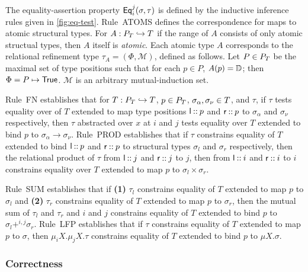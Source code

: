 The equality-assertion property $\mathsf{Eq}_{i}^{j}(\sigma, \tau)$ is defined
by the inductive inference rules given in \autoref{fig:eq-test}.
%
Rule~ATOMS defines the correspondence for maps to atomic structural
types.
For $A : P_T \hookrightarrow T$ if the range of $A$ consists of only
atomic structual types, then $A$ itself is \emph{atomic}.
Each atomic type $A$ corresponds to the relational refinement type
$\tau_A = (\Phi, \mathcal{M})$, defined as follows.
Let $P \in P_T$ be the maximal set of type positions such that for
each $p \in P$, $A(p) = \mathbb{D}$;
%
then $\Phi = P \mapsto \mathsf{True}$.
%
$\mathcal{M}$ is an arbitrary mutual-induction set.

Rule~FN establishes that for $T : P_T \hookrightarrow T$,
$p \in P_T$, $\sigma_{\alpha}, \sigma_{\nu} \in T$, and
$\tau$, if $\tau$ tests equality over of $T$ extended to map type
positions $\mathsf{l} \mathbin{::} p$ and $\mathsf{r} \mathbin{::} p$ to
$\sigma_{\alpha}$ and $\sigma_{\nu}$ respectively, then $\tau$
abstracted over $x$ at $i$ and $j$ tests equality over $T$ extended to
bind $p$ to $\sigma_{\alpha} \to \sigma_{\nu}$.
Rule~PROD establishes that if $\tau$ constrains equality of $T$
extended to bind $\mathsf{l} \mathbin{::} p$ and $\mathsf{r} \mathbin{::} p$ to
structural types $\sigma_l$ and $\sigma_r$ respectively, then the
relational product of $\tau$ from $\mathsf{l} \mathbin{::} j$ and
$\mathsf{r} \mathbin{::} j$ to $j$, then from $\mathsf{l} \mathbin{::} i$ and
$\mathsf{r} \mathbin{::} i$ to $i$ constrains equality over $T$ extended to
map $p$ to $\sigma_l \times \sigma_r$.

Rule~SUM establishes that if %
\textbf{(1)} $\tau_l$ constrains equality of $T$ extended to map $p$
to $\sigma_l$ and %
\textbf{(2)} $\tau_r$ constrains equality of $T$ extended to map $p$
to $\sigma_r$, then %
the mutual sum of $\tau_l$ and $\tau_r$ and $i$ and $j$ constrains
equality of $T$ extended to bind $p$ to $\sigma_l +^{i, j} \sigma_r$.
%
Rule~LFP establishes that if %
$\tau$ constrains equality of $T$ extended to map $p$ to $\sigma$,
then $\mu_i X. \mu_j X. \tau$ constrains equality of $T$ extended to
bind $p$ to $\mu X. \sigma$.

\subsubsection{Correctness}
\label{sec:corr}

